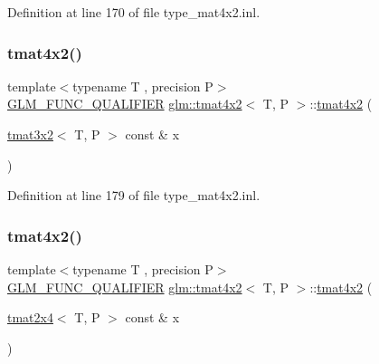 Definition at line 170 of file type\+\_\+mat4x2.\+inl.

\mbox{\label{structglm_1_1tmat4x2_a0a7ddc1c8f35c932b5b4084fe83d6d89}} 
\subsubsection{\texorpdfstring{tmat4x2()}{tmat4x2()}\hspace{0.1cm}{\footnotesize\ttfamily [15/22]}}
{\footnotesize\ttfamily template$<$typename T , precision P$>$ \\
\mbox{\hyperlink{setup_8hpp_a33fdea6f91c5f834105f7415e2a64407}{G\+L\+M\+\_\+\+F\+U\+N\+C\+\_\+\+Q\+U\+A\+L\+I\+F\+I\+ER}} \mbox{\hyperlink{structglm_1_1tmat4x2}{glm\+::tmat4x2}}$<$ T, P $>$\+::\mbox{\hyperlink{structglm_1_1tmat4x2}{tmat4x2}} (\begin{DoxyParamCaption}\item[{\mbox{\hyperlink{structglm_1_1tmat3x2}{tmat3x2}}$<$ T, P $>$ const \&}]{x }\end{DoxyParamCaption})}



Definition at line 179 of file type\+\_\+mat4x2.\+inl.

\mbox{\label{structglm_1_1tmat4x2_ad48b340a40204cd9b05cf0b7233cccb4}} 
\subsubsection{\texorpdfstring{tmat4x2()}{tmat4x2()}\hspace{0.1cm}{\footnotesize\ttfamily [16/22]}}
{\footnotesize\ttfamily template$<$typename T , precision P$>$ \\
\mbox{\hyperlink{setup_8hpp_a33fdea6f91c5f834105f7415e2a64407}{G\+L\+M\+\_\+\+F\+U\+N\+C\+\_\+\+Q\+U\+A\+L\+I\+F\+I\+ER}} \mbox{\hyperlink{structglm_1_1tmat4x2}{glm\+::tmat4x2}}$<$ T, P $>$\+::\mbox{\hyperlink{structglm_1_1tmat4x2}{tmat4x2}} (\begin{DoxyParamCaption}\item[{\mbox{\hyperlink{structglm_1_1tmat2x4}{tmat2x4}}$<$ T, P $>$ const \&}]{x }\end{DoxyParamCaption})}



